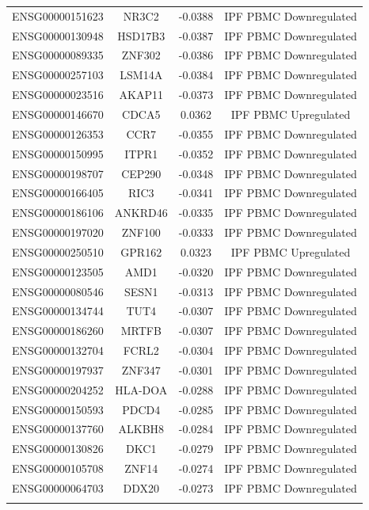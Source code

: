 \documentclass[
]{article}
\begin{document}
\begin{singlespace}
\begin{longtable}[t]{lccc}
\addlinespace
ENSG00000151623 & NR3C2 & -0.0388 & IPF PBMC Downregulated\\
ENSG00000130948 & HSD17B3 & -0.0387 & IPF PBMC Downregulated\\
ENSG00000089335 & ZNF302 & -0.0386 & IPF PBMC Downregulated\\
ENSG00000257103 & LSM14A & -0.0384 & IPF PBMC Downregulated\\
ENSG00000023516 & AKAP11 & -0.0373 & IPF PBMC Downregulated\\
\addlinespace
ENSG00000146670 & CDCA5 & 0.0362 & IPF PBMC Upregulated\\
ENSG00000126353 & CCR7 & -0.0355 & IPF PBMC Downregulated\\
ENSG00000150995 & ITPR1 & -0.0352 & IPF PBMC Downregulated\\
ENSG00000198707 & CEP290 & -0.0348 & IPF PBMC Downregulated\\
ENSG00000166405 & RIC3 & -0.0341 & IPF PBMC Downregulated\\
\addlinespace
ENSG00000186106 & ANKRD46 & -0.0335 & IPF PBMC Downregulated\\
ENSG00000197020 & ZNF100 & -0.0333 & IPF PBMC Downregulated\\
ENSG00000250510 & GPR162 & 0.0323 & IPF PBMC Upregulated\\
ENSG00000123505 & AMD1 & -0.0320 & IPF PBMC Downregulated\\
ENSG00000080546 & SESN1 & -0.0313 & IPF PBMC Downregulated\\
\addlinespace
ENSG00000134744 & TUT4 & -0.0307 & IPF PBMC Downregulated\\
ENSG00000186260 & MRTFB & -0.0307 & IPF PBMC Downregulated\\
ENSG00000132704 & FCRL2 & -0.0304 & IPF PBMC Downregulated\\
ENSG00000197937 & ZNF347 & -0.0301 & IPF PBMC Downregulated\\
ENSG00000204252 & HLA-DOA & -0.0288 & IPF PBMC Downregulated\\
\addlinespace
ENSG00000150593 & PDCD4 & -0.0285 & IPF PBMC Downregulated\\
ENSG00000137760 & ALKBH8 & -0.0284 & IPF PBMC Downregulated\\
ENSG00000130826 & DKC1 & -0.0279 & IPF PBMC Downregulated\\
ENSG00000105708 & ZNF14 & -0.0274 & IPF PBMC Downregulated\\
ENSG00000064703 & DDX20 & -0.0273 & IPF PBMC Downregulated\\
\addlinespace

\end{longtable}
\end{singlespace}
\end{document}
